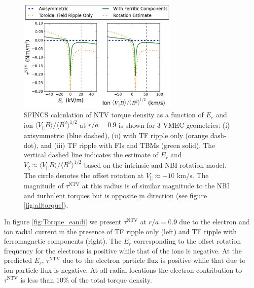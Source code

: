 \documentclass[aip, pop, preprint]{revtex4-1}
\begin{document}
\FloatBarrier

\begin{figure}[h!]
\centering
\includegraphics[width=0.7\textwidth]{figure6.eps}
\caption{\label{fig:Torque_ErandV} SFINCS calculation of NTV torque density as a function of $E_r$ and ion $\langle V_{||} B \rangle/\langle B^2 \rangle^{1/2}$ at $r/a = 0.9$ is shown for 3 VMEC geometries: (i) axisymmetric (blue dashed), (ii) with TF ripple only (orange dash-dot), and (iii) TF ripple with FIs and TBMs (green solid). The vertical dashed line indicates the estimate of $E_r$ and $V_{\zeta} \approx \langle V_{||} B \rangle/\langle B^2 \rangle^{1/2}$ based on the intrinsic and NBI rotation model. The circle denotes the offset rotation at $V_{||} \approx -10$ km/s. The magnitude of $\tau^{\mathrm{NTV}}$ at this radius is of similar magnitude to the NBI and turbulent torques but is opposite in direction (see figure \ref{fig:alltorque}).}
\end{figure}

In figure \ref{fig:Torque_eandi} we present $\tau^{\mathrm{NTV}}$ at $r/a = 0.9$ due to the electron and ion radial current in the presence of TF ripple only (left) and TF ripple with ferromagnetic components (right). The $E_r$ corresponding to the offset rotation frequency for the electrons is positive while that of the ions is negative. At the predicted $E_r$, $\tau^{\mathrm{NTV}}$ due to the electron particle flux is positive while that due to ion particle flux is negative. At all radial locations the electron contribution to $\tau^{\mathrm{NTV}}$ is less than 10\% of the total torque density. 
\end{document}
